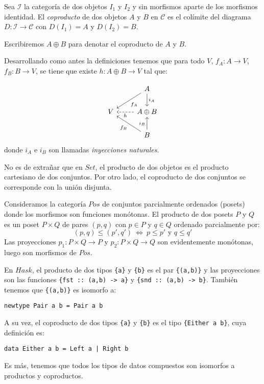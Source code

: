 \documentclass[12pt, twoside]{book}
\newcommand{\code}[1]{\Verb+{#1}+}
\newcommand{\cat}{{\mathcal{C}}}
\newcommand{\Set}{{Set}}
\newcommand{\Hask}{{Hask}}
\newcommand{\sii}{{\ \Leftrightarrow\ }}
\begin{document}
\begin{definition}
Sea $\mathcal{I}$ la categoría de dos objetos $I_1$ y $I_2$ y sin morfismos aparte de los morfismos identidad. El \emph{coproducto} de dos objetos $A$ y $B$ en $\cat$ es el colímite del diagrama $D \colon \mathcal{I} \to \cat$ con $D(I_1) = A$ y $D(I_2) = B$.

Escribiremos $A \oplus B$ para denotar el coproducto de $A$ y $B$.
\end{definition}

Desarrollando como antes la definiciones tenemos que para todo $V$, $f_A \colon A \to V$, $f_B \colon B \to V$, se tiene que existe $h \colon A \oplus B \to V$ tal que:

\[\begin{tikzcd}
 & A \arrow[dl,"f_A"] \arrow[d,"i_A"]\\
V & A \oplus B \arrow[l,dashed,"h"]\\
 & B \arrow[ul,"f_B"] \arrow[u,"i_B"]
\end{tikzcd}\]
donde $i_A$ e $i_B$ son llamadas \emph{inyecciones naturales}.

\begin{example}
No es de extrañar que en $\Set$, el producto de dos objetos es el producto cartesiano de dos conjuntos.
Por otro lado, el coproducto de dos conjuntos se corresponde con la unión disjunta.
\end{example}

\begin{example}\label{ejemplo-producto-pos}
Consideramos la categoría $Pos$ de conjuntos parcialmente ordenados (posets) donde los morfismos son funciones monótonas.
El producto de dos posets $P$ y $Q$ es un poset $P \times Q$ de pares $(p,q)$ con $p \in P$ y $q \in Q$ ordenado parcialmente por:
\[ (p,q) \leq (p',q') \sii p \leq p' \text{ y }q \leq q' \]
Las proyecciones $p_1 \colon P \times Q \to P$ y $p_2 \colon P \times Q \to Q$ son evidentemente monótonas, luego son morfismos de $Pos$.
\end{example}

\begin{example}
En $\Hask$, el producto de dos tipos \code{a} y \code{b} es el par \code{(a,b)} y las proyecciones son las funciones \code{fst :: (a,b) -> a} y \code{snd :: (a,b) -> b}.
También tenemos que \code{(a,b)} es isomorfo a:
\begin{verbatim}
newtype Pair a b = Pair a b
\end{verbatim}
A su vez, el coproducto de dos tipos \code{a} y \code{b} es el tipo \code{Either a b}, cuya definición es:
\begin{verbatim}
data Either a b = Left a | Right b
\end{verbatim}
Es más, tenemos que todos los tipos de datos compuestos son isomorfos a productos y coproductos.
\end{example}
\end{document}
